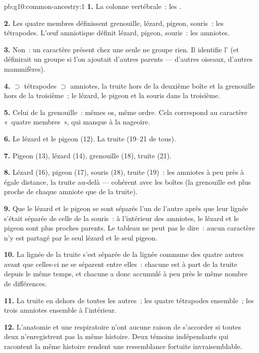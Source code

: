 \begin{solution}{pb:g10:common-ancestry:1}
\textbf{1.} La colonne vertébrale~: les .

\textbf{2.} Les quatre membres définissent grenouille, lézard, pigeon,
souris~: les tétrapodes. L'œuf amniotique définit lézard, pigeon,
souris~: les amniotes.

\textbf{3.} Non~: un caractère présent chez une seule  ne groupe
rien. Il identifie l' (et définirait un groupe si l'on ajoutait
d'autres parents --- d'autres oiseaux, d'autres mammifères).

\textbf{4.}  $\supset$ tétrapodes $\supset$ amniotes, la
truite hors de la deuxième boîte et la grenouille hors de la
troisième~; le lézard, le pigeon et la souris dans la troisième.

\textbf{5.} Celui de la grenouille~: mêmes os, même ordre. Cela
correspond au caractère «~quatre membres~», qui manque à la nageoire.

\textbf{6.} Le lézard et le pigeon (12). La truite (19--21 de tous).

\textbf{7.} Pigeon (13), lézard (14), grenouille (18), truite (21).

\textbf{8.} Lézard (16), pigeon (17), souris (18), truite (19)~: les
amniotes à peu près à égale distance, la truite au-delà --- cohérent
avec les boîtes (la grenouille est plus proche de chaque amniote que de
la truite).

\textbf{9.} Que le lézard et le pigeon se sont séparés l'un de l'autre
après que leur lignée s'était séparée de celle de la souris~: à
l'intérieur des amniotes, le lézard et le pigeon sont plus proches
parents. Le tableau ne peut pas le dire~: aucun caractère n'y est
partagé par le seul lézard et le seul pigeon.

\textbf{10.} La lignée de la truite s'est séparée de la lignée commune
des quatre autres avant que celles-ci ne se séparent entre elles~:
chacune est à part de la truite depuis le même temps, et chacune a donc
accumulé à peu près le même nombre de différences.

\textbf{11.} La truite en dehors de toutes les autres~; les quatre
tétrapodes ensemble~; les trois amniotes ensemble à l'intérieur.

\textbf{12.} L'anatomie et une  respiratoire n'ont aucune
raison de s'accorder si toutes deux n'enregistrent pas la même
histoire. Deux témoins indépendants qui racontent la même histoire
rendent une ressemblance fortuite invraisemblable.


\end{solution}
